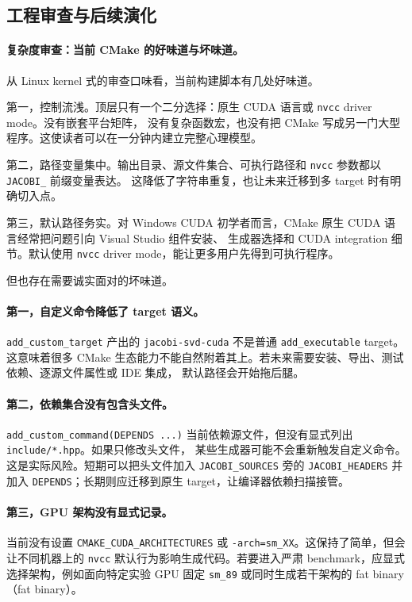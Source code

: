 \subsection{工程审查与后续演化}

\paragraph{复杂度审查：当前 CMake 的好味道与坏味道。}

从 Linux kernel 式的审查口味看，当前构建脚本有几处好味道。

第一，控制流浅。顶层只有一个二分选择：原生 CUDA 语言或 \texttt{nvcc} driver mode。没有嵌套平台矩阵，
没有复杂函数宏，也没有把 CMake 写成另一门大型程序。这使读者可以在一分钟内建立完整心理模型。

第二，路径变量集中。输出目录、源文件集合、可执行路径和 \texttt{nvcc} 参数都以 \texttt{JACOBI\_} 前缀变量表达。
这降低了字符串重复，也让未来迁移到多 target 时有明确切入点。

第三，默认路径务实。对 Windows CUDA 初学者而言，CMake 原生 CUDA 语言经常把问题引向 Visual Studio 组件安装、
生成器选择和 CUDA integration 细节。默认使用 \texttt{nvcc} driver mode，能让更多用户先得到可执行程序。

但也存在需要诚实面对的坏味道。

\paragraph{第一，自定义命令降低了 target 语义。}
\texttt{add\_custom\_target} 产出的 \texttt{jacobi-svd-cuda} 不是普通 \texttt{add\_executable} target。
这意味着很多 CMake 生态能力不能自然附着其上。若未来需要安装、导出、测试依赖、逐源文件属性或 IDE 集成，
默认路径会开始拖后腿。

\paragraph{第二，依赖集合没有包含头文件。}
\texttt{add\_custom\_command(DEPENDS ...)} 当前依赖源文件，但没有显式列出 \texttt{include/*.hpp}。如果只修改头文件，
某些生成器可能不会重新触发自定义命令。这是实际风险。短期可以把头文件加入 \texttt{JACOBI\_SOURCES} 旁的
\texttt{JACOBI\_HEADERS} 并加入 \texttt{DEPENDS}；长期则应迁移到原生 target，让编译器依赖扫描接管。

\paragraph{第三，GPU 架构没有显式记录。}
当前没有设置 \texttt{CMAKE\_CUDA\_ARCHITECTURES} 或 \texttt{-arch=sm\_XX}。这保持了简单，但会让不同机器上的
\texttt{nvcc} 默认行为影响生成代码。若要进入严肃 benchmark，应显式选择架构，例如面向特定实验 GPU 固定
\texttt{sm\_89} 或同时生成若干架构的 fat binary（fat binary）。

